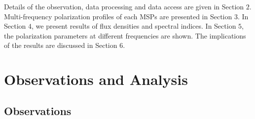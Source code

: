 \documentclass[useAMS,usenatbib]{mn2e}
\begin{document}
%
%
%

Details of the observation, data processing and data access are given in 
Section $2$. Multi-frequency polarization profiles of each MSPs are presented 
in Section $3$.
%
In Section $4$, we present results of flux densities and spectral indices.
%
In Section $5$, the polarization parameters at different frequencies are 
shown.
%
The implications of the results are discussed in Section $6$.





\section{Observations and Analysis}

\subsection{Observations}
\end{document}
